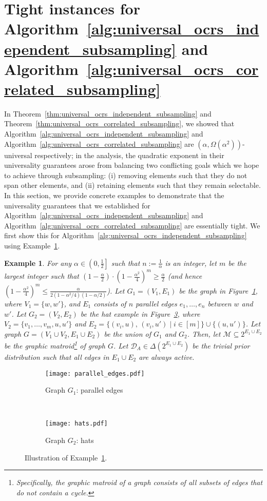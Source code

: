 \documentclass[11pt]{article}
\newcommand{\D}{\mathcal D}
\newcommand{\M}{{\mathcal M}}
\newtheorem{example}[theorem]{Example}
\begin{document}
\section{Tight instances for Algorithm~\ref{alg:universal_ocrs_independent_subsampling} and Algorithm~\ref{alg:universal_ocrs_correlated_subsampling}}\label{sec:tight_instances}
In Theorem~\ref{thm:universal_ocrs_independent_subsampling} and Theorem~\ref{thm:universal_ocrs_correlated_subsampling}, we showed that Algorithm~\ref{alg:universal_ocrs_independent_subsampling} and Algorithm~\ref{alg:universal_ocrs_correlated_subsampling} are $(\alpha,\Omega(\alpha^2))$-universal respectively; in the analysis, the quadratic exponent in their universality guarantees arose from balancing two conflicting goals which we hope to achieve through subsampling: (i) removing elements such that they do not span other elements, and (ii) retaining elements such that they remain selectable. In this section, we provide concrete examples to demonstrate that the universality guarantees that we established for Algorithm~\ref{alg:universal_ocrs_independent_subsampling} and Algorithm~\ref{alg:universal_ocrs_correlated_subsampling} are essentially tight. We first show this for Algorithm~\ref{alg:universal_ocrs_independent_subsampling} using Example~\ref{ex:independent_subsampling_lower_bound}.
\begin{example}\label{ex:independent_subsampling_lower_bound}
For any $\alpha\in\left(0,\frac{1}{2}\right]$ such that $n:=\frac{1}{\alpha}$ is an integer, let $m$ be the largest integer such that $\left(1-\frac{\alpha}{2}\right)\cdot\left(1-\frac{\alpha^2}{4}\right)^m\ge\frac{\alpha}{2}$ (and hence $\left(1-\frac{\alpha^2}{4}\right)^m\le\frac{\alpha}{2(1-\alpha^2/4)(1-\alpha/2)}$). Let $G_1=(V_1,E_1)$ be the graph in Figure~\ref{fig:parallel_edges}, where $V_1=\{w,w'\}$, and $E_1$ consists of $n$ parallel edges $e_1,\dots,e_n$ between $w$ and $w'$. Let $G_2=(V_2,E_2)$ be the hat example in Figure~\ref{fig:hats}, where $V_2=\{v_1,\dots,v_m,u,u'\}$ and $E_2=\{(v_i,u),\,(v_i,u')\mid i\in[m]\}\cup\{(u,u')\}$. Let graph $G=(V_1\cup V_2, E_1\cup E_2)$ be the union of $G_1$ and $G_2$. Then, let $\M\subseteq 2^{E_1\cup E_2}$ be the graphic matroid\footnote{Specifically, the graphic matroid of a graph consists of all subsets of edges that do not contain a cycle.} of graph $G$. Let $\D_A\in\Delta(2^{E_1\cup E_2})$ be the trivial prior distribution such that all edges in $E_1\cup E_2$ are always active.
\end{example}
\begin{figure}
    \centering
    \begin{subfigure}{0.49\textwidth}
        \centering
        \texttt{[image: parallel\_edges.pdf]}
        \caption{Graph $G_1$: parallel edges}
        \label{fig:parallel_edges}
    \end{subfigure}~
    \begin{subfigure}{0.49\textwidth}
        \centering
        \texttt{[image: hats.pdf]}
        \caption{Graph $G_2$: hats}
        \label{fig:hats}
    \end{subfigure}
    \caption{Illustration of Example~\ref{ex:independent_subsampling_lower_bound}.}
\end{figure}
\end{document}
